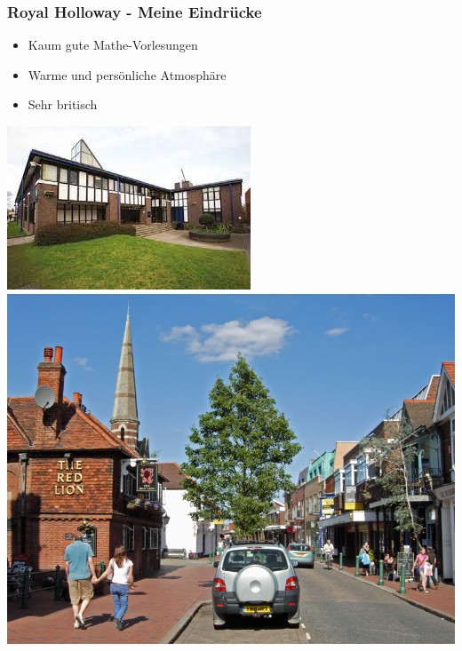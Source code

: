 \documentclass{beamer}
\begin{document}
\begin{frame}
    \frametitle{Royal Holloway - Meine Eindrücke}

    \begin{minipage}{0.5\textwidth}
        \begin{itemize}
            \item Kaum gute Mathe-Vorlesungen
            \item Warme und persönliche Atmosphäre
            \item Sehr britisch
        \end{itemize}
    \end{minipage}%
    \begin{minipage}{0.5\textwidth}
        \includegraphics[width = \textwidth]{bedford.png}
        ~\\
        \includegraphics[width = \textwidth]{egham.png}
    \end{minipage}%
\end{frame}
\end{document}
